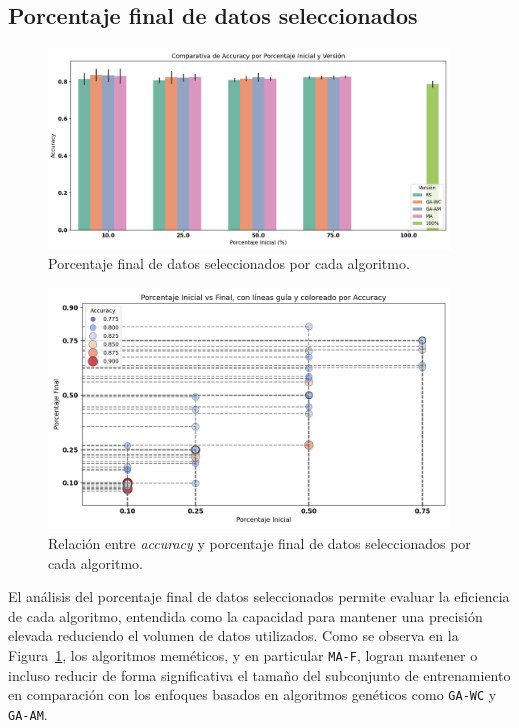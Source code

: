 \subsection{Porcentaje final de datos seleccionados}\label{sec:porcentaje-final-datos-seleccionados}
\begin{figure}[htp]
    \centering
    \includegraphics[width=0.95\textwidth]{imagenes/evaluaciones/final/barplot-por-porcentaje.png}
    \caption{Porcentaje final de datos seleccionados por cada algoritmo.}
    \label{fig:barplot-por-porcentaje}
\end{figure}
\begin{figure}[htp]
    \centering
    \includegraphics[width=0.95\textwidth]{imagenes/evaluaciones/final/scatter.png}
    \caption{Relación entre \textit{accuracy} y porcentaje final de datos seleccionados por cada algoritmo.}
    \label{fig:scatter-final}
\end{figure}El análisis del porcentaje final de datos seleccionados permite evaluar la eficiencia de cada algoritmo,
entendida como la capacidad para mantener una precisión elevada reduciendo el volumen de datos utilizados.
Como se observa en la Figura~\ref{fig:barplot-por-porcentaje}, los algoritmos meméticos, y en particular \texttt{MA-F},
logran mantener o incluso reducir de forma significativa el tamaño del subconjunto de entrenamiento en comparación con
los enfoques basados en algoritmos genéticos como \texttt{GA-WC} y \texttt{GA-AM}.


